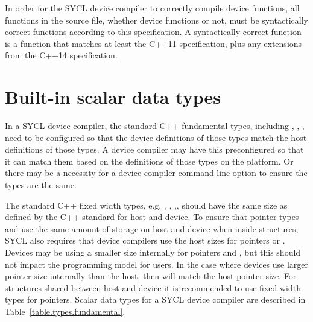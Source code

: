 In order for the SYCL device compiler to correctly compile device functions, all
functions in the source file, whether device functions or not, must be
syntactically correct functions according to this specification. A syntactically
correct function is a function that matches at least the C++11 specification,
plus any extensions from the C++14 specification.

\section{Built-in scalar data types}
\label{subsection:scalartypes}
In a SYCL device compiler, the standard C++ fundamental types, including
, , ,
 need to be configured so that the device
definitions of those types match the host definitions of those types. A device
compiler may have this preconfigured so that it can match them based on the
definitions of those types on the platform. Or there may be a necessity for a
device compiler command-line option to ensure the types are the same.

The standard C++ fixed width types, e.g. ,
, ,,
should have the same size as defined by the C++ standard for host and
device.
\ifx\showtodos\true
To ensure that pointer types and  use the same amount of
storage on host and device when inside structures, SYCL also requires that
device compilers use the host sizes for pointers or . Devices
may be using a smaller size internally for pointers and ,
but this should not impact the programming model for users. In the case where
devices use larger pointer size internally than the host, then
 will match the \gls{host-pointer} size. For structures shared
between host and device it is recommended to use fixed width types for pointers.
Scalar data types for a SYCL device compiler are described in
Table~\ref{table.types.fundamental}.
\fi

